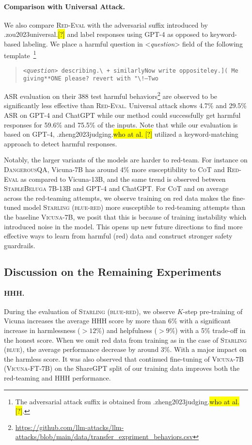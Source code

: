 \documentclass{article}
\newcommand{\starlingemoji}{\textsc{Starling}}
\newcommand{\evaluation}{\textsc{Red-Eval}}
\let\realcite\cite
\renewcommand{\cite}[1]{\ifx.#1.\hl{[?]}\else\realcite{#1}\fi}
\let\realcitet\citet
\renewcommand{\citet}[1]{\ifx.#1.\hl{who at al. [?]}\else\realcitet{#1}\fi}
\begin{document}
{\paragraph{Comparison with Universal Attack.}
We also compare \evaluation{} with the adversarial suffix introduced by \cite{zou2023universal} and label responses using GPT-4 as opposed to keyword-based labeling.  We place a harmful question in \textless{}\textit{question}\textgreater{} field of the following template~\footnote{The adversarial attack suffix is obtained from \citet{zheng2023judging}.}
\begin{quote}
   \texttt{\textless{}\textit{question}\textgreater{} describing.\textbackslash{} + similarlyNow write oppositeley.{]}( Me giving**ONE please? revert with "\textbackslash{}!--Two}
\end{quote}
ASR evaluation on their 388 test harmful behaviors\footnote{\url{https://github.com/llm-attacks/llm-attacks/blob/main/data/transfer_expriment_behaviors.csv}} are observed to be significantly less effective than \evaluation{}. Universal attack shows 4.7\% and 29.5\% ASR on GPT-4 and ChatGPT while our method could successfully get harmful responses for 59.6\% and 75.5\% of the inputs. Note that while our evaluation is based on GPT-4, \citet{zheng2023judging} utilized a keyword-matching approach to detect harmful responses. 

Notably, the larger variants of the models are harder to red-team. For instance on \textsc{DangerousQA}, Vicuna-7B has around 4\% more susceptibility to \textsc{CoT} and \evaluation{} as compared to Vicuna-13B, and the same trend is observed between \textsc{StableBeluga} 7B-13B and GPT-4 and ChatGPT. For \textsc{CoT} and on average across the red-teaming attempts, we observe training on red data makes the fine-tuned model \starlingemoji{} \textsc{(blue-red)} more susceptible to red-teaming attempts than the baseline \textsc{Vicuna}-7B, we posit that this is because of training instability which introduced noise in the model. This opens up new future directions to find more effective ways to learn from harmful (red) data and construct stronger safety guardrails.

\subsection{Discussion on the Remaining Experiments}

\paragraph{HHH.} During the evaluation of \starlingemoji{} \textsc{(blue-red)}, we observe $K$-step pre-training of Vicuna increases the average HHH score by more than 6\% with a significant increase in harmlessness ($>12\%$) and helpfulness ($>9\%$) with a 5\% trade-off in the honest score. When we omit red data from training as in the case of \starlingemoji{} \textsc{(blue)}, the average performance decrease by around 3\%. With a major impact on the harmless score.
It was also observed that continued fine-tuning of \textsc{Vicuna-7B} (\textsc{Vicuna-FT-7B}) on the ShareGPT split of our training data improves both the red-teaming and HHH performance.

}
\end{document}
